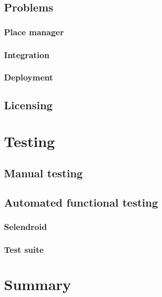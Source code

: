 \documentclass[12pt,oneside,final]{fithesis2}
\begin{document}
\section{Problems}
\subsection{Place manager}
\subsection{Integration}
\subsection{Deployment}


\section{Licensing}

\chapter{Testing}
\section{Manual testing}
\section{Automated functional testing}
\subsection{Selendroid}
\subsection{Test suite}

\chapter{Summary}

\printbibliography
\end{document}
